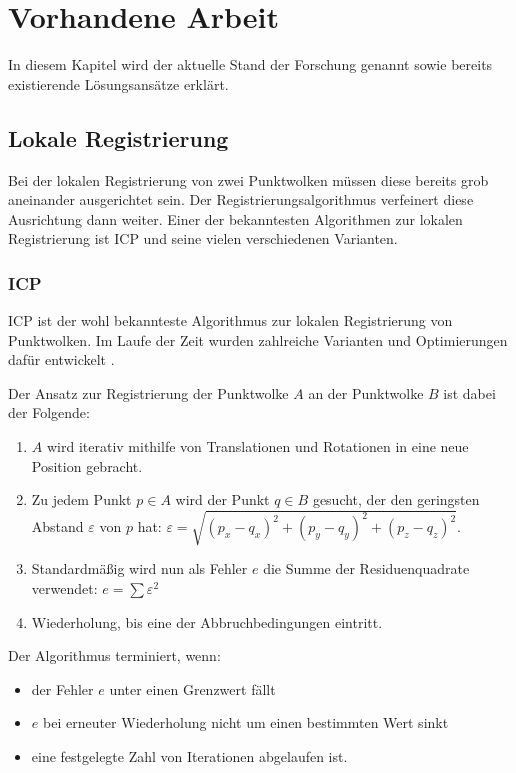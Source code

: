 
\chapter{Vorhandene Arbeit}
\label{ch:vorhandene-arbeit}

In diesem Kapitel wird der aktuelle Stand der Forschung genannt sowie bereits existierende Lösungsansätze erklärt.


\section{Lokale Registrierung}
\label{sec:local-registration}

Bei der lokalen Registrierung von zwei Punktwolken müssen diese bereits grob aneinander ausgerichtet sein.
Der Registrierungsalgorithmus verfeinert diese Ausrichtung dann weiter.
Einer der bekanntesten Algorithmen zur lokalen Registrierung ist \ac{ICP} und seine vielen verschiedenen Varianten.


\subsection{\acl{ICP}}
\label{subsec:icp}

\ac{ICP} \cite{besl1992method} ist der wohl bekannteste Algorithmus zur lokalen Registrierung von Punktwolken.
Im Laufe der Zeit wurden zahlreiche Varianten und Optimierungen dafür entwickelt \cite{rusinkiewicz2001efficient}.

Der Ansatz zur Registrierung der Punktwolke $A$ an der Punktwolke $B$ ist dabei der Folgende:
\begin{enumerate}
\item $A$ wird iterativ mithilfe von Translationen und Rotationen in eine neue Position gebracht.
\item Zu jedem Punkt $p \in A$ wird der Punkt $q \in B$ gesucht, der den geringsten Abstand $\varepsilon$ von $p$ hat: $\varepsilon = \sqrt{(p_x - q_x)^2 + (p_y - q_y)^2 + (p_z - q_z)^2}$.
\item Standardmäßig wird nun als Fehler $e$ die Summe der Residuenquadrate verwendet: $e = \sum \varepsilon^2$
\item Wiederholung, bis eine der Abbruchbedingungen eintritt.
\end{enumerate}

Der Algorithmus terminiert, wenn:
\begin{itemize}
\item der Fehler $e$ unter einen Grenzwert fällt
\item $e$ bei erneuter Wiederholung nicht um einen bestimmten Wert sinkt
\item eine festgelegte Zahl von Iterationen abgelaufen ist.
\end{itemize}

